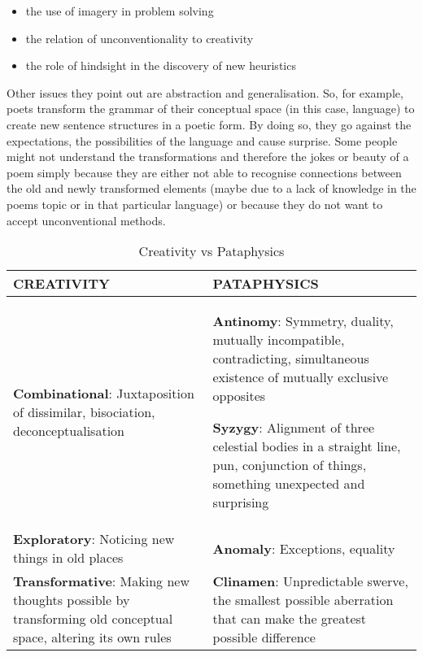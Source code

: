 \begin{itemize}
  \item the use of imagery in problem solving
  \item the relation of unconventionality to creativity
  \item the role of hindsight in the discovery of new heuristics
\end{itemize}

\begin{leftbar}
Other issues they point out are abstraction and generalisation. So, for example, poets transform the grammar of their conceptual space (in this case, language) to create new sentence structures in a poetic form. By doing so, they go against the expectations, the possibilities of the language and cause surprise. Some people might not understand the transformations and therefore the jokes or beauty of a poem simply because they are either not able to recognise connections between the old and newly transformed elements (maybe due to a lack of knowledge in the poems topic or in that particular language) or because they do not want to accept unconventional methods.
\end{leftbar}

\begin{table}[!htbp]
\caption[Creativity vs Pataphysics]{Creativity vs Pataphysics}
\label{tab:creatpata}
  \begin{tabu}{XX}
  \toprule
  \textbf{CREATIVITY} & \textbf{PATAPHYSICS} \\
  \midrule
  \textbf{Combinational}: Juxtaposition of dissimilar, bisociation, deconceptualisation
  &
  \textbf{Antinomy}: Symmetry, duality, mutually incompatible, contradicting, simultaneous existence of mutually exclusive opposites
  \par
  \textbf{Syzygy}: Alignment of three celestial bodies in a
  straight line, pun, conjunction of things, something unexpected
  and surprising
  \\ \midrule
  \textbf{Exploratory}: Noticing new things in old places
  &
  \textbf{Anomaly}: Exceptions, equality
  \\ \midrule
  \textbf{Transformative}: Making new thoughts possible by transforming old conceptual space, altering its own rules
  &
  \textbf{Clinamen}: Unpredictable swerve, the smallest possible aberration that can make the greatest possible difference
  \\
  \bottomrule
  \end{tabu}
\end{table}


